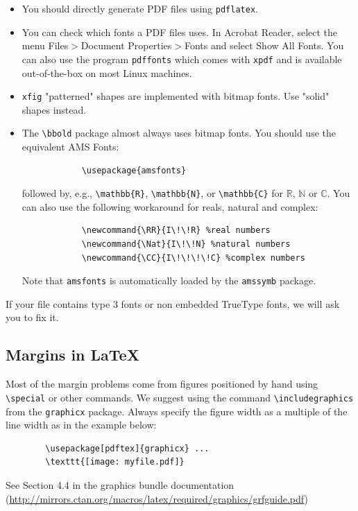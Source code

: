 \documentclass{article}
\begin{document}
	
	\begin{itemize}
		
		
		\item You should directly generate PDF files using \verb+pdflatex+.
		
		
		\item You can check which fonts a PDF files uses.  In Acrobat Reader, select the
		menu Files$>$Document Properties$>$Fonts and select Show All Fonts. You can
		also use the program \verb+pdffonts+ which comes with \verb+xpdf+ and is
		available out-of-the-box on most Linux machines.
		
		
		\item \verb+xfig+ "patterned" shapes are implemented with bitmap fonts.  Use
		"solid" shapes instead.
		
		
		\item The \verb+\bbold+ package almost always uses bitmap fonts.  You should use
		the equivalent AMS Fonts:
		\begin{verbatim}
			\usepackage{amsfonts}
		\end{verbatim}
		followed by, e.g., \verb+\mathbb{R}+, \verb+\mathbb{N}+, or \verb+\mathbb{C}+
		for $\mathbb{R}$, $\mathbb{N}$ or $\mathbb{C}$.  You can also use the following
		workaround for reals, natural and complex:
		\begin{verbatim}
			\newcommand{\RR}{I\!\!R} %real numbers
			\newcommand{\Nat}{I\!\!N} %natural numbers
			\newcommand{\CC}{I\!\!\!\!C} %complex numbers
		\end{verbatim}
		Note that \verb+amsfonts+ is automatically loaded by the \verb+amssymb+ package.
		
		
	\end{itemize}
	
	
	If your file contains type 3 fonts or non embedded TrueType fonts, we will ask
	you to fix it.
	
	
	\subsection{Margins in \LaTeX{}}
	
	
	Most of the margin problems come from figures positioned by hand using
	\verb+\special+ or other commands. We suggest using the command
	\verb+\includegraphics+ from the \verb+graphicx+ package. Always specify the
	figure width as a multiple of the line width as in the example below:
	\begin{verbatim}
		\usepackage[pdftex]{graphicx} ...
		\texttt{[image: myfile.pdf]}
	\end{verbatim}
	See Section 4.4 in the graphics bundle documentation
	(\url{http://mirrors.ctan.org/macros/latex/required/graphics/grfguide.pdf})
	
\end{document}

